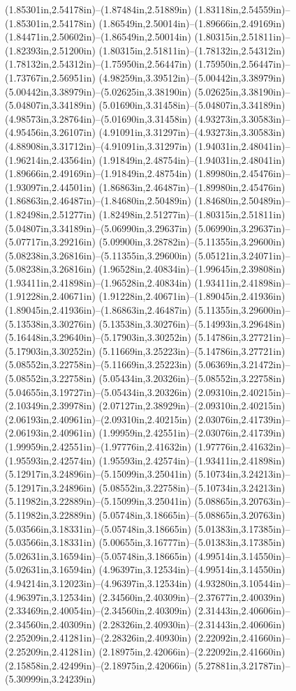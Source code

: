 (1.85301in,2.54178in)--(1.87484in,2.51889in) (1.83118in,2.54559in)--(1.85301in,2.54178in) (1.86549in,2.50014in)--(1.89666in,2.49169in) (1.84471in,2.50602in)--(1.86549in,2.50014in) (1.80315in,2.51811in)--(1.82393in,2.51200in) (1.80315in,2.51811in)--(1.78132in,2.54312in) (1.78132in,2.54312in)--(1.75950in,2.56447in) (1.75950in,2.56447in)--(1.73767in,2.56951in) (4.98259in,3.39512in)--(5.00442in,3.38979in) (5.00442in,3.38979in)--(5.02625in,3.38190in) (5.02625in,3.38190in)--(5.04807in,3.34189in) (5.01690in,3.31458in)--(5.04807in,3.34189in) (4.98573in,3.28764in)--(5.01690in,3.31458in) (4.93273in,3.30583in)--(4.95456in,3.26107in) (4.91091in,3.31297in)--(4.93273in,3.30583in) (4.88908in,3.31712in)--(4.91091in,3.31297in) (1.94031in,2.48041in)--(1.96214in,2.43564in) (1.91849in,2.48754in)--(1.94031in,2.48041in) (1.89666in,2.49169in)--(1.91849in,2.48754in) (1.89980in,2.45476in)--(1.93097in,2.44501in) (1.86863in,2.46487in)--(1.89980in,2.45476in) (1.86863in,2.46487in)--(1.84680in,2.50489in) (1.84680in,2.50489in)--(1.82498in,2.51277in) (1.82498in,2.51277in)--(1.80315in,2.51811in) (5.04807in,3.34189in)--(5.06990in,3.29637in) (5.06990in,3.29637in)--(5.07717in,3.29216in) (5.09900in,3.28782in)--(5.11355in,3.29600in) (5.08238in,3.26816in)--(5.11355in,3.29600in) (5.05121in,3.24071in)--(5.08238in,3.26816in) (1.96528in,2.40834in)--(1.99645in,2.39808in) (1.93411in,2.41898in)--(1.96528in,2.40834in) (1.93411in,2.41898in)--(1.91228in,2.40671in) (1.91228in,2.40671in)--(1.89045in,2.41936in) (1.89045in,2.41936in)--(1.86863in,2.46487in) (5.11355in,3.29600in)--(5.13538in,3.30276in) (5.13538in,3.30276in)--(5.14993in,3.29648in) (5.16448in,3.29640in)--(5.17903in,3.30252in) (5.14786in,3.27721in)--(5.17903in,3.30252in) (5.11669in,3.25223in)--(5.14786in,3.27721in) (5.08552in,3.22758in)--(5.11669in,3.25223in) (5.06369in,3.21472in)--(5.08552in,3.22758in) (5.05434in,3.20326in)--(5.08552in,3.22758in) (5.04655in,3.19727in)--(5.05434in,3.20326in) (2.09310in,2.40215in)--(2.10349in,2.39978in) (2.07127in,2.38929in)--(2.09310in,2.40215in) (2.06193in,2.40961in)--(2.09310in,2.40215in) (2.03076in,2.41739in)--(2.06193in,2.40961in) (1.99959in,2.42551in)--(2.03076in,2.41739in) (1.99959in,2.42551in)--(1.97776in,2.41632in) (1.97776in,2.41632in)--(1.95593in,2.42574in) (1.95593in,2.42574in)--(1.93411in,2.41898in) (5.12917in,3.24896in)--(5.15099in,3.25041in) (5.10734in,3.24213in)--(5.12917in,3.24896in) (5.08552in,3.22758in)--(5.10734in,3.24213in) (5.11982in,3.22889in)--(5.15099in,3.25041in) (5.08865in,3.20763in)--(5.11982in,3.22889in) (5.05748in,3.18665in)--(5.08865in,3.20763in) (5.03566in,3.18331in)--(5.05748in,3.18665in) (5.01383in,3.17385in)--(5.03566in,3.18331in) (5.00655in,3.16777in)--(5.01383in,3.17385in) (5.02631in,3.16594in)--(5.05748in,3.18665in) (4.99514in,3.14550in)--(5.02631in,3.16594in) (4.96397in,3.12534in)--(4.99514in,3.14550in) (4.94214in,3.12023in)--(4.96397in,3.12534in) (4.93280in,3.10544in)--(4.96397in,3.12534in) (2.34560in,2.40309in)--(2.37677in,2.40039in) (2.33469in,2.40054in)--(2.34560in,2.40309in) (2.31443in,2.40606in)--(2.34560in,2.40309in) (2.28326in,2.40930in)--(2.31443in,2.40606in) (2.25209in,2.41281in)--(2.28326in,2.40930in) (2.22092in,2.41660in)--(2.25209in,2.41281in) (2.18975in,2.42066in)--(2.22092in,2.41660in) (2.15858in,2.42499in)--(2.18975in,2.42066in) (5.27881in,3.21787in)--(5.30999in,3.24239in) 